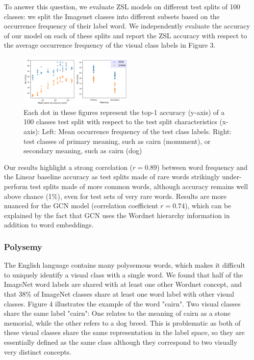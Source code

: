 To answer this question, we evaluate ZSL models on different test splits of 100 classes:
we split the Imagenet classes into different subsets based on the occurrence frequency of their label word.
We independently evaluate the accuracy of our model on each of these splits and report the ZSL accuracy
with respect to the average occurrence frequency of the visual class labels in Figure 3.

\begin{figure}[h]
\includegraphics[width=0.5\textwidth]{Figure_3.png}
\caption{
Each dot in these figures represent the top-1 accuracy (y-axis) of a 100 classes test split with respect to the test split characteristics (x-axis):
Left:  Mean occurrence frequency of the test class labels.
Right: test classes of primary meaning, such as cairn (monument), or secondary meaning, such as cairn (dog)
}
\end{figure}

Our results highlight a strong correlation ($r=0.89$) between word frequency and the Linear baseline accuracy 
as test splits made of rare words strikingly under-perform test splits made of more common words,
although accuracy remains well above chance (1\%), even for test sets of very rare words.
Results are more nuanced for the GCN model (correlation coefficient $r=0.74$), which can be explained by the 
fact that GCN uses the Wordnet hierarchy information in addition to word embeddings.

\subsubsection{Polysemy}

The English language contains many polysemous words, which makes it difficult to uniquely identify a visual class with a single word.
We found that half of the ImageNet word labels are shared with at least one other Wordnet concept,
and that 38\% of ImageNet classes share at least one word label with other visual classes.
Figure 4 illustrates the example of the word "cairn". 
Two visual classes share the same label "cairn":
One relates to the meaning of cairn as a stone memorial, while the other refers to a dog breed.
This is problematic as both of these visual classes share the same representation in the label space,
so they are essentially defined as the same class although they correspond to two visually very distinct concepts.

